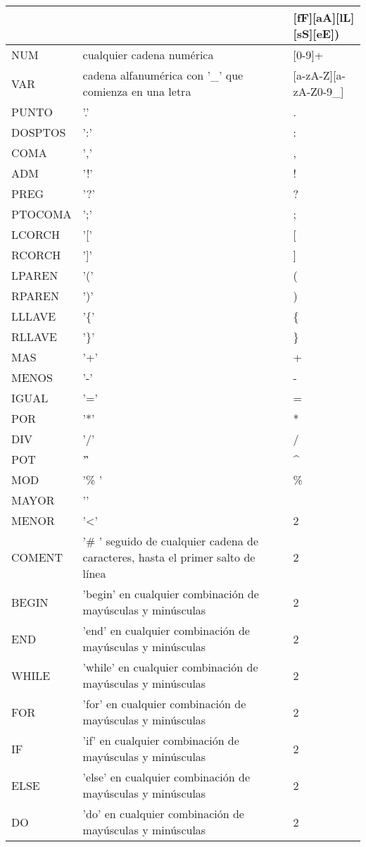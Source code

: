 \begin{table}[!htb]
\begin{center}
\begin{tabular}{| l | l | l |}
	& 				& [fF][aA][lL][sS][eE]) \\
\hline
NUM 	& cualquier cadena numérica & [0-9]+ \\
\hline
VAR 	& cadena alfanumérica con '_' que comienza en una letra & [a-zA-Z][a-zA-Z0-9_] \\
\hline
PUNTO & '.' & . \\
\hline
DOSPTOS	& ':' & : \\
\hline
COMA & ',' & , \\
\hline
ADM & '!' & ! \\
\hline
PREG & '?' & ? \\
\hline
PTOCOMA 	& ';' & ; \\
\hline
LCORCH & '[' & [ \\
\hline
RCORCH & ']' & ] \\
\hline
LPAREN & '(' & ( \\
\hline
RPAREN & ')' & ) \\
\hline
LLLAVE & '\{' & \{ \\
\hline
RLLAVE& '\}' & \} \\
\hline
MAS & '+' & + \\
\hline
MENOS & '-' & - \\
\hline
IGUAL & '=' & = \\
\hline
POR & '*' & * \\
\hline
DIV & '/' & / \\
\hline
POT & '\^' & \^ \\
\hline
MOD & '\% ' & \% \\
\hline
MAYOR & '\>' & \> \\
\hline
MENOR & '<' & 2 \\
\hline
COMENT &'\# ' seguido de cualquier cadena de caracteres, hasta el primer salto de línea & 2 \\
\hline
BEGIN & 'begin' en cualquier combinación de mayúsculas y minúsculas & 2 \\
\hline
END & 'end' en cualquier combinación de mayúsculas y minúsculas & 2 \\
\hline
WHILE & 'while' en cualquier combinación de mayúsculas y minúsculas & 2 \\
\hline
FOR & 'for' en cualquier combinación de mayúsculas y minúsculas & 2 \\
\hline
IF & 'if' en cualquier combinación de mayúsculas y minúsculas & 2 \\
\hline
ELSE & 'else' en cualquier combinación de mayúsculas y minúsculas & 2 \\
\hline
DO & 'do' en cualquier combinación de mayúsculas y minúsculas & 2 \\

\end{tabular}
\end{center}
\end{table}
